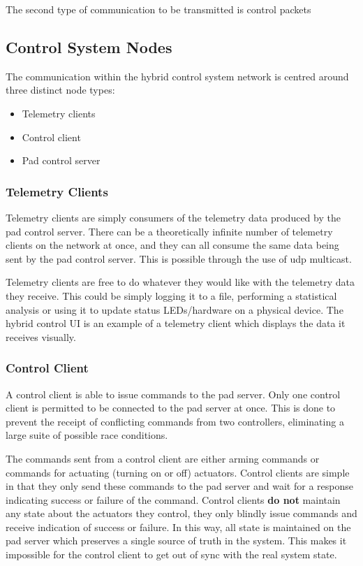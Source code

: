The second type of communication to be transmitted is control packets

\subsection{Control System Nodes}

The communication within the hybrid control system network is centred around three distinct node types:

\begin{itemize}
    \item Telemetry clients
    \item Control client
    \item Pad control server
\end{itemize}

\subsubsection{Telemetry Clients}

Telemetry clients are simply consumers of the telemetry data produced by the pad control server. There can be a
theoretically infinite number of telemetry clients on the network at once, and they can all consume the same data being
sent by the pad control server. This is possible through the use of \gls{udp} multicast.

Telemetry clients are free to do whatever they would like with the telemetry data they receive. This could be simply
logging it to a file, performing a statistical analysis or using it to update status LEDs/hardware on a physical
device. The hybrid control UI is an example of a telemetry client which displays the data it receives visually.

\subsubsection{Control Client}

A control client is able to issue commands to the pad server. Only one control client is permitted to be connected to
the pad server at once. This is done to prevent the receipt of conflicting commands from two controllers, eliminating a
large suite of possible race conditions.

The commands sent from a control client are either arming commands or commands for actuating (turning on or off)
actuators. Control clients are simple in that they only send these commands to the pad server and wait for a response
indicating success or failure of the command. Control clients \textbf{do not} maintain any state about the actuators
they control, they only blindly issue commands and receive indication of success or failure. In this way, all state is
maintained on the pad server which preserves a single source of truth in the system. This makes it impossible for the
control client to get out of sync with the real system state.

